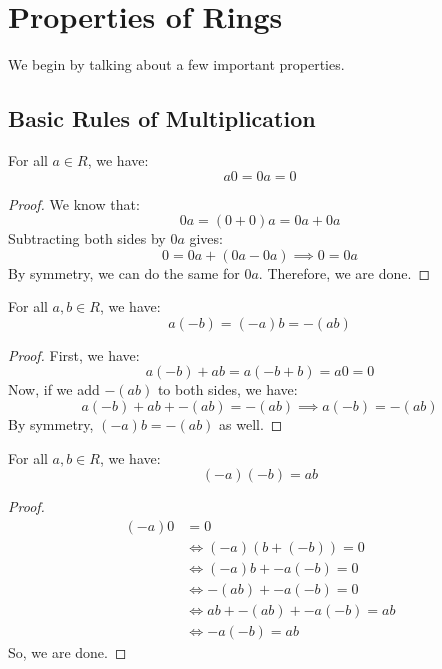\documentclass[letterpaper]{article}
\begin{document}
\section{Properties of Rings}
We begin by talking about a few important properties. 

\subsection{Basic Rules of Multiplication}
\begin{theorem}{}{}
    For all $a \in R$, we have: 
    \[a0 = 0a = 0\]
\end{theorem}

\begin{mdframed}[]
    \begin{proof}
        We know that: 
        \[0a = (0 + 0)a = 0a + 0a\]
        Subtracting both sides by $0a$ gives: 
        \[0 = 0a + (0a - 0a) \implies 0 = 0a\]
        By symmetry, we can do the same for $0a$. Therefore, we are done.
    \end{proof}    
\end{mdframed}

\begin{theorem}{}{}
    For all $a, b \in R$, we have:
    \[a(-b) = (-a)b = -(ab)\]
\end{theorem}

\begin{mdframed}[]
    \begin{proof}
        First, we have: 
        \[a(-b) + ab = a(-b + b) = a0 = 0\]
        Now, if we add $-(ab)$ to both sides, we have: 
        \[a(-b) + ab + -(ab) = -(ab) \implies a(-b) = -(ab)\]
        By symmetry, $(-a)b = -(ab)$ as well. 
    \end{proof}
\end{mdframed}

\begin{theorem}{}{}
    For all $a, b \in R$, we have: 
    \[(-a)(-b) = ab\]
\end{theorem}

\begin{mdframed}[]
    \begin{proof}
        \begin{equation*}
            \begin{aligned}
                (-a)0 &= 0 \\ 
                    &\iff (-a)(b + (-b)) = 0 \\ 
                    &\iff (-a)b + -a(-b) = 0 \\ 
                    &\iff -(ab) + -a(-b) = 0 \\ 
                    &\iff ab + -(ab) + -a(-b) = ab \\
                    &\iff -a(-b) = ab
            \end{aligned}
        \end{equation*}
        So, we are done. 
    \end{proof}
\end{mdframed}
\end{document}

